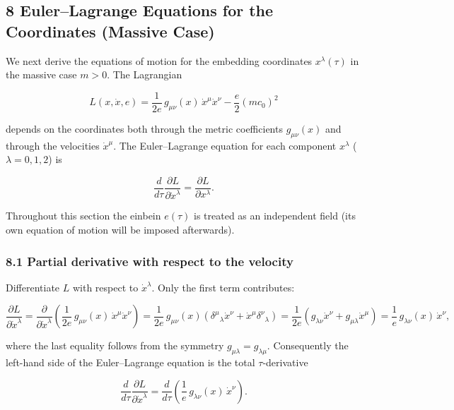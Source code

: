 \documentclass[
]{article}
\begin{document}
\hypertarget{eulerlagrange-equations-for-the-coordinates-massive-case}{%
\subsection{8 Euler--Lagrange Equations for the Coordinates (Massive
Case)}\label{eulerlagrange-equations-for-the-coordinates-massive-case}}

We next derive the equations of motion for the embedding coordinates
\(x^{\lambda}(\tau)\) in the massive case \(m > 0\). The Lagrangian

\[L(x, \dot{x}, e) = \frac{1}{2e}\, g_{\mu\nu}(x)\, \dot{x}^{\mu} \dot{x}^{\nu} - \frac{e}{2}(mc_{0})^{2} \tag{31}\]

depends on the coordinates both through the metric coefficients
\(g_{\mu\nu}(x)\) and through the velocities \(\dot{x}^{\mu}\). The
Euler--Lagrange equation for each component \(x^{\lambda}\)
(\(\lambda = 0, 1, 2\)) is

\[\frac{d}{d\tau} \frac{\partial L}{\partial \dot{x}^{\lambda}} = \frac{\partial L}{\partial x^{\lambda}}. \tag{32}\]

Throughout this section the einbein \(e(\tau)\) is treated as an
independent field (its own equation of motion will be imposed
afterwards).

\hypertarget{partial-derivative-with-respect-to-the-velocity}{%
\subsubsection{8.1 Partial derivative with respect to the
velocity}\label{partial-derivative-with-respect-to-the-velocity}}

Differentiate \(L\) with respect to \(\dot{x}^{\lambda}\). Only the
first term contributes:

\[\frac{\partial L}{\partial \dot{x}^{\lambda}} = \frac{\partial}{\partial \dot{x}^{\lambda}} \left( \frac{1}{2e}\, g_{\mu\nu}(x)\, \dot{x}^{\mu} \dot{x}^{\nu} \right)
= \frac{1}{2e}\, g_{\mu\nu}(x) \left( \delta^{\mu}{}_{\lambda} \dot{x}^{\nu} + \dot{x}^{\mu} \delta^{\nu}{}_{\lambda} \right)
= \frac{1}{2e} \left( g_{\lambda\nu} \dot{x}^{\nu} + g_{\mu\lambda} \dot{x}^{\mu} \right)
= \frac{1}{e}\, g_{\lambda\nu}(x)\, \dot{x}^{\nu}, \tag{33}\]

where the last equality follows from the symmetry
\(g_{\mu\lambda} = g_{\lambda\mu}\). Consequently the left-hand side of
the Euler--Lagrange equation is the total \(\tau\)-derivative

\[\frac{d}{d\tau} \frac{\partial L}{\partial \dot{x}^{\lambda}} = \frac{d}{d\tau} \left( \frac{1}{e}\, g_{\lambda\nu}(x)\, \dot{x}^{\nu} \right). \tag{34}\]
\end{document}
